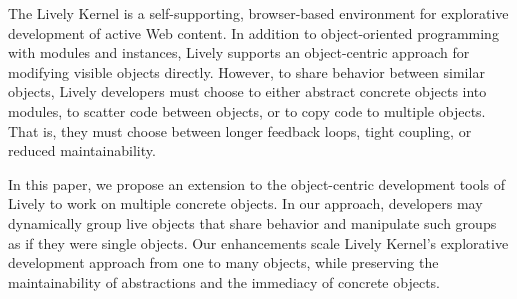The Lively Kernel is a self-supporting, browser-based environment for
explorative development of active Web content. 
In addition to object-oriented programming with modules and instances, Lively supports an object-centric approach for modifying visible objects directly.
However, to share behavior between similar objects, Lively developers must choose to either abstract concrete objects into modules, to scatter code between objects, or to copy code to multiple objects. That is, they must choose between longer feedback loops, tight coupling, or reduced maintainability.

In this paper, we propose an extension to the object-centric
development tools of Lively to work on multiple concrete objects. In
our approach, developers may dynamically group live objects that share
behavior and manipulate such groups as if they were single objects.
Our enhancements scale Lively Kernel's explorative development
approach from one to many objects, while preserving the maintainability of
abstractions and the immediacy of concrete objects.

